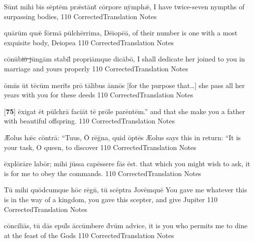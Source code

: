 \latline
  {S\=unt m\-ih\-i b\=is s\=ept\=em pr\={\ae}st\=ant\={\macron {\i}} c\=orp\-or\-e n\=ymph\={\ae},
}
  {I have twice-seven nympths of surpassing bodies, }
  {110}
  { CorrectedTranslation }
  { Notes }


\latline
  {qu\={\macron a}r\=um qu\={\ae} f\=orm\={\macron a} p\=ulch\=err\-im\-a, D\={\macron e}\-i\-op\={\macron e}\=a,
}
  { of their number is one with a most exquisite body, Deiopea }
  {110}
  { CorrectedTranslation }
  { Notes }


\latline
  {c\={\macron o}n\={\macron u}b\sout{i\={\macron o} j}\=ung\=am st\-ab\-il\={\macron {\i}} pr\-opr\-i\=amqu\-e d\-ic\={\macron a}b\=o,
}
  { I shall dedicate her joined to you in marriage and yours properly }
  {110}
  { CorrectedTranslation }
  { Notes }


\latline
  {\=omn\={\macron {\i}}s \=ut t\={\macron e}c\=um m\-er\-it\={\macron {\i}}s pr\={\macron o} t\={\macron a}l\-ib\-us \=ann\={\macron o}s
}
  { [for the purpose that\ldots] she pass all her years with you for these deeds }
  {110}
  { CorrectedTranslation }
  { Notes }


\latline
  {[\textbf{75}] \=ex\-ig\-at \=et p\=ulchr\={\macron a} f\-ac\-i\=at t\={\macron e} pr\={\macron o}l\-e p\-ar\=ent\=em.''
}
  { and that she make you a father with beautiful offspring. }
  {110}
  { CorrectedTranslation }
  { Notes }


\latline
  {\={\AE}\-ol\-us h\={\ae}c c\=ontr\={\macron a}:  ``T\-u\-us, \={\macron O} r\={\macron e}g\={\macron {\i}}n\-a, qu\-id \=opt\={\macron e}s}
  { {\AE}olus says this in return:  ``It is your task, O queen, to discover  }
  {110}
  { CorrectedTranslation }
  { Notes }


\latline
  {\=expl\={\macron o}r\={\macron a}r\-e l\-ab\=or; m\-ih\-i j\=uss\-a c\-ap\=ess\-er\-e f\={\macron a}s \=est.
}
  { that which you might wish to ask, it is for me to obey the commands. }
  {110}
  { CorrectedTranslation }
  { Notes }


\latline
  {T\={\macron u} m\-ih\-i qu\=odc\-umqu\-e h\=oc r\={\macron e}gn\={\macron {\i}}, t\={\macron u} sc\={\macron e}ptr\-a J\-ov\=emqu\=e
}
  { You gave me whatever this is in the way of a kingdom, you gave this scepter, and give Jupiter }
  {110}
  { CorrectedTranslation }
  { Notes }


\latline
  {c\=onc\-il\-i\={\macron a}s, t\={\macron u} d\={\macron a}s \-ep\-ul\={\macron {\i}}s \=acc\=umb\-er\-e d\={\macron {\i}}v\=um
}
  { advice, it is you who permits me to dine at the feast of the Gods }
  {110}
  { CorrectedTranslation }
  { Notes }


